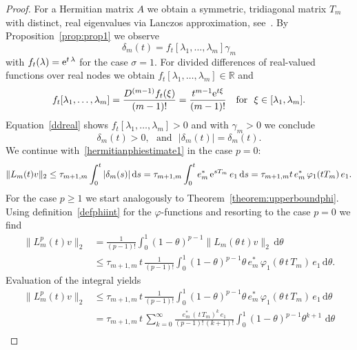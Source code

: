\documentclass[smallextended]{svjour3pre}%
\numberwithin{equation}{section}
\numberwithin{figure}{section}
\numberwithin{table}{section}
\newcommand{\R}{\mathbb R}
\newcommand{\divdif}[2]{#2[#1]}
\newcommand\tjnew[1]{{#1}}
\newcommand\phif\varphi
\newcommand{\dd}{\mathrm{d}}
\newcommand{\ee}{{\rm e}}
\newcommand\sca{\sigma}
\newcommand\Opgen{A}
\begin{document}
\begin{proof}
For \tjnew{a Hermitian} matrix $\Opgen$ we obtain a symmetric, tridiagonal matrix $T_m$ with distinct, real eigenvalues via Lanczos approximation, see~\cite[Chap. 3.1]{horn85}.
By Proposition~\ref{prop:prop1} we observe
\begin{equation*}
\delta_m(t) = \divdif{\lambda_1,\ldots,\lambda_m}{f_t} \gamma_m
\end{equation*}
with $f_t(\lambda)=\ee^{t\,\lambda}$ for the case $\sca=1$.
For divided differences of real-valued functions over real nodes we obtain $\divdif{\lambda_1,\ldots,\lambda_m}{f_t} \in \R$ and
\begin{equation}\label{ddreal}
\divdif{\lambda_1,\ldots,\lambda_m}{f_t} = \frac{D^{(m-1)} f_t(\xi)}{(m-1)!} = \frac{t^{m-1} \ee^{t\xi}}{(m-1)!}~~~\text{for}~~\xi\in[\lambda_1,\lambda_m].
\end{equation}
Equation~\eqref{ddreal} shows $\divdif{\lambda_1,\ldots,\lambda_m}{f_t} > 0$ and with $\gamma_m > 0 $ we conclude
\begin{equation*}
\delta_m(t) > 0,~~~\text{and}~~~|\delta_m(t)|=\delta_m(t).
\end{equation*}
We continue with~\eqref{hermitianphiestimate1} in the case $p=0$:
\begin{equation*}
\|L_m(t)v\|_2\leq \tau_{m+1,m} \int_0^t |\delta_m(s)|\,\dd s = \tau_{m+1,m} \int_0^t e_m^\ast\,\ee^{sT_m} \,e_1 \,\dd s = \tau_{m+1,m} t \, e_m^\ast \, \phif_1(tT_m) \, e_1.
\end{equation*}
For the case $p \geq 1$ we start analogously to Theorem~\ref{theorem:upperboundphi}.
Using definition~\eqref{defphiint} for the $\phif$-functions
and resorting to the case $p=0$ we find
\begin{align*}
\| L_m^p(t)v \|_2
&= \frac{1}{(p-1)!} \int_0^1 (1-\theta)^{p-1}  \|L_m(\theta\,t)v\|_2 \,\dd \theta\\
&\leq \tau_{m+1,m}\,t\,\frac{1}{(p-1)!} \int_0^1 (1-\theta)^{p-1} \theta \, e_m^\ast \, \phif_1(\theta\,t\,T_m) \, e_1  \,\dd \theta.
\end{align*}
Evaluation of the integral yields
\begin{equation}\label{partofproofphicor1}
\begin{aligned}
\| L_m^p(t)v \|_2
&\leq \tau_{m+1,m}\,t\,\frac{1}{(p-1)!} \int_0^1 (1-\theta)^{p-1} \theta \, e_m^\ast \, \phif_1(\theta\,t\,T_m) \, e_1  \,\dd \theta\\
&= \tau_{m+1,m}\,t\,\sum_{k=0}^{\infty}\frac{e_m^\ast \,(\,t\,T_m)^k \, e_1}{(p-1)!\,(k+1)!} \int_0^1 (1-\theta)^{p-1} \theta^{k+1} \,     \,\dd \theta \\

\end{aligned}
\end{equation}
\end{proof}
\end{document}
